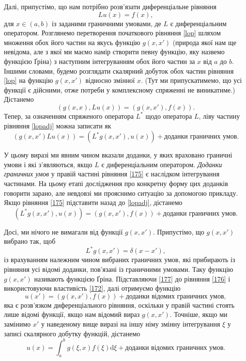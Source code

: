 \documentclass[14pt,twoside]{extreport}
\theoremstyle{mystyle}
\numberwithin{equation}{chapter}
\begin{document}
Далі, припустімо, що нам потрібно розв'язати диференціальне рівняння
\begin{equation}\label{lop}
Lu(x)=f(x),
\end{equation}
для $x\in(a,b)$ із заданими граничними умовами, де $L$ є диференціальним оператором. Розглянемо перетворення початкового рівняння \eqref{lop} шляхом множення обох його частин на якусь функцію $g(x, x')$ (природа якої нам ще невідома, але з якої ми маємо намір створити певну функцію, яку назвемо функцією Ґріна) з наступним інтегруванням обох його частин за $x$ від $a$ до $b$. Іншими словами, будемо розглядати скалярний добуток обох частин рівняння \eqref{lop} на функцію $g(x, x')$ відносно змінної $x$. (Тут ми припускатимемо, що усі функції є дійсними, отже потреби у комплексному спряженні не виникатиме.) Дістанемо
\begin{equation}\label{lopadj}
(g(x, x), Lu(x))=(g(x, x'),f(x)).
\end{equation}
Тепер, за означенням спряженого оператора $L^{*}$ щодо оператора $L$, ліву частину рівняння \eqref{lopadj} можна записати як
\begin{equation}\label{175}
(g(x, x') L u(x)) = (L^{*} g(x, x'), u(x))+\textrm{доданки граничних умов}.
\end{equation}

У цьому виразі ми явним чином вказали доданки, у яких враховано граничні умови і які з'являються, якщо $L$ є диференціальним оператором. \emph{Доданки граничних умов} у правій частині рівняння \eqref{175} є наслідком інтегрування частинами. На цьому етапі дослідження про конкретну форму цих доданків говорити зарано, але невдовзі ми прояснимо ситуацію за допомогою прикладу. Якщо рівняння \eqref{175} підставити назад до \eqref{lopadj}, дістанемо
\begin{equation}\label{176}
(L^{*}g(x, x'), u(x))=(g(x, x'), f(x)) + \textrm{доданки граничних умов}.
\end{equation}

Досі, ми нічого не вимагали від функції $g(x, x')$. Припустімо, що $g(x, x')$ вибрано так, щоб
\begin{equation}\label{177}
L^{*}g(x,x')=\delta(x-x'),
\end{equation}
із врахуванням належним чином вибраних граничних умов, які прибирають із рівняння усі відомі доданки, пов'язані із граничними умовами. Таку функцію $g(x, x')$ називають функцією Ґріна. Підставляючи \eqref{177} до рівняння \eqref{176} і використовуючи властивість \eqref{172}, далі отримуємо функцію
\begin{equation}\label{178}
u(x')=(g(x, x'), f(x)) + \textrm{доданки відомих граничних умов},
\end{equation}
яка є розв'язком диференціального рівняння, оскільки у правій частині стоять лише відомі функції, якщо нам відомий вираз $g(x, x')$. Точніше, якщо ми замінимо $x'$ у наведеному вище виразі на іншу німу змінну інтегрування $\xi$ у записі скалярного добутку функцій, дістанемо
\begin{equation}\label{179}
u(x)=\int_{a}^{b}g(\xi, x)f(\xi)\mathrm{d}\xi + \textrm{доданки відомих граничних умов}.
\end{equation}
\end{document}
